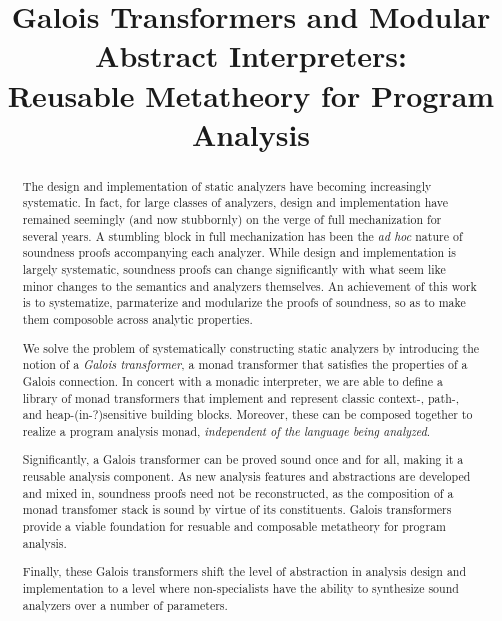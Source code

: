 \documentclass[pldi,nocopyrightspace]{sigplanconf}
\begin{document}
\setlength{\abovedisplayskip}{0em}
\setlength{\belowdisplayskip}{0em}
\setlength{\abovedisplayshortskip}{0em}
\setlength{\belowdisplayshortskip}{0em}

\title{Galois Transformers and Modular Abstract Interpreters:\\ Reusable Metatheory for Program Analysis}
\maketitle

\begin{abstract}

The design and implementation of static analyzers have becoming
increasingly systematic.  In fact, for large classes of analyzers, design and
implementation have remained seemingly (and now stubbornly) on the verge of full mechanization
for several years.  A stumbling block in full mechanization has been the
\emph{ad hoc} nature of soundness proofs accompanying each analyzer.
While design and implementation is largely systematic, soundness proofs
can change significantly with what seem like minor changes to the
semantics and analyzers themselves.  An achievement of this work is to systematize, parmaterize and modularize the proofs of soundness, so as to make them composoble across analytic properties.

\par We solve the problem of systematically constructing static
analyzers by introducing the notion of a \emph{Galois transformer}, a
monad transformer that satisfies the properties of a Galois
connection.  In concert with a monadic interpreter, we are able to
define a library of monad transformers that implement and represent classic context-,
path-, and heap-(in-?)sensitive building blocks.  Moreover, these can be composed
together to realize a program analysis monad, \emph{independent of the
  language being analyzed}.

\par Significantly, a Galois transformer can be proved sound once and
for all, making it a reusable analysis component.  As new analysis
features and abstractions are developed and mixed in, soundness proofs
need not be reconstructed, as the composition of a monad transfomer
stack is sound by virtue of its constituents.  Galois
transformers provide a viable foundation for resuable and composable 
metatheory for program analysis.

Finally, these Galois transformers shift the level of abstraction in analysis design and implementation
to a level where non-specialists have the ability to synthesize sound analyzers
over a number of parameters.
\end{abstract}





\end{document}
